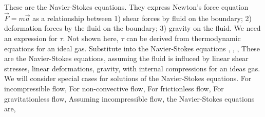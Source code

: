 \documentclass{article}
\begin{document}
These are the Navier-Stokes equations. They express Newton's force equation $\vec{F}=m\vec{a}$ as a relationship between 1) shear forces by fluid on the boundary; 2) deformation forces by the fluid on the boundary; 3) gravity on the fluid. We need an expression for $\tau$. Not shown here, $\tau$ can be derived from thermodynamic equations for an ideal gas.
Substitute into the Navier-Stokes equations , , ,
These are the Navier-Stokes equations, assuming the fluid is influced by linear shear stresses, linear deformations, gravity, with internal compressions for an ideas gas. We will consider special cases for solutions of the Navier-Stokes equations. For incompressible flow,
For non-convective flow,
For frictionless flow,
For gravitationless flow,
Assuming incompressible flow, the Navier-Stokes equations are,
\end{document}
